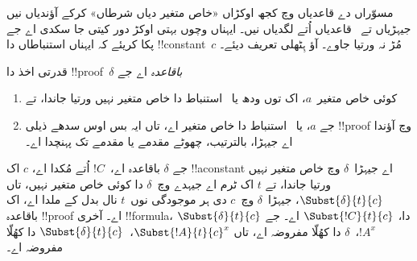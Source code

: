 \documentclass[../../../include/open-logic-section]{subfiles}
\begin{document}


مسوّراں دے قاعدیاں وچ کجھ اوکڑاں «خاص متغیر دیاں شرطاں» کرکے آؤندیاں نیں جیہڑیاں \Elim{\lexists} تے~\Intro{\lforall} قاعدیاں اُتے لگدیاں نیں۔ ایہناں وچوں بہتی اوکڑ دور کیتی جا سکدی اے جے پکا کریئے کہ ایہناں استنباطاں دا !!{constant}~$c$ مُڑ نہ ورتیا جاوے۔ آؤ ہِٹھلی تعریف دیئے۔

\begin{defn}
قدرتی اخذ دا !!{proof}~$\delta$ \emph{باقاعدہ} اے جے
\begin{enumerate}
\item کوئی خاص متغیر~$a$، اک توں ودھ \Elim{\lexists} یا~\Intro{\lforall} استنباط دا خاص متغیر نہیں ورتیا جاندا، تے
\item جے $a$، \Elim{\lexists} یا~\Intro{\lforall} استنباط دا خاص متغیر اے، تاں ایہ بس اوس سدھے ذیلی !!{proof} وچ آؤندا اے جیہڑا، بالترتیب، چھوٹے مقدمے یا مقدمے تک پہنچدا اے۔
\end{enumerate}
\end{defn}

\begin{lem}
جے $\delta$ باقاعدہ اے،~$!C$ اُتے مُکدا اے، $c$ اک !!a{constant} اے جیہڑا~$\delta$ وچ خاص متغیر نہیں ورتیا جاندا، تے $t$ اک ٹرم اے جیہدے وچ~$\delta$ دا کوئی خاص متغیر نہیں، تاں $\Subst{\delta}{t}{c}$، جیہڑا~$\delta$ وچ~$c$ دی ہر موجودگی نوں~$t$ نال بدل کے ملدا اے، اک باقاعدہ !!{proof} اے۔ آخری !!{formula}، $\Subst{\delta}{t}{c}$ دا، $\Subst{!C}{t}{c}$ اے۔ جے $!A^x$،~$\delta$ دا کھُلّا مفروضہ اے، تاں $\Subst{!A}{t}{c}^x$،~$\Subst{\delta}{t}{c}$ دا کھُلّا مفروضہ اے۔
\end{lem}
\end{document}
